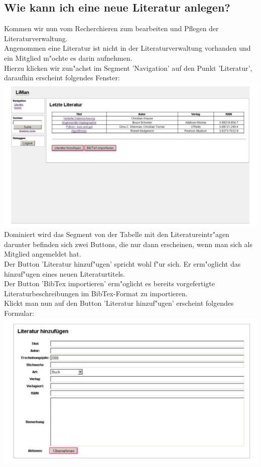 \subsection{Wie kann ich eine neue Literatur anlegen?}
Kommen wir nun vom Recherchieren zum bearbeiten und Pflegen der Literaturverwaltung.\\
Angenommen eine Literatur ist nicht in der Literaturverwaltung vorhanden und ein Mitglied m"ochte es darin aufnehmen.\\
Hierzu klicken wir zun"achst im Segment 'Navigation' auf den Punkt 'Literatur', daraufhin erscheint folgendes Fenster:\\
\includegraphics[scale=0.8]{lit_ins}\\
Dominiert wird das Segment von der Tabelle mit den Literatureintr"agen darunter befinden sich zwei Buttons, die nur dann erscheinen, wenn man sich als Mitglied angemeldet hat.\\
Der Button 'Literatur hinzuf"ugen' spricht wohl f"ur sich. Er erm"oglicht das hinzuf"ugen eines neuen Literaturtitels.\\
Der Button 'BibTex importieren' erm"oglicht es bereits vorgefertigte Literaturbeschreibungen im BibTex-Format zu importieren.\\
Klickt man nun auf den Button 'Literatur hinzuf"ugen' erscheint folgendes Formular:\\
\includegraphics[scale=0.8]{lit_ins1}\\